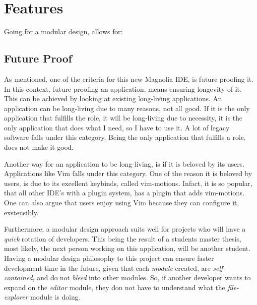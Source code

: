 \documentclass[runningheads]{llncs}
\begin{document}
\section{Features}
Going for a modular design, allows for:

\subsection{Future Proof}
As mentioned, one of the criteria for this new Magnolia IDE, is future proofing
it. In this context, future proofing an application, means ensuring longevity of
it. This can be achieved by looking at existing long-living applications. An
application can be long-living due to many reasons, not all good. If it is the
only application that fulfills the role, it will be long-living due to
necessity, it is the only application that does what I need, so I have to use
it. A lot of legacy software falls under this category. Being the only
application that fulfills a role, does not make it good.

Another way for an application to be long-living, is if it is beloved by its
users. Applications like Vim falls under this category. One of the reason it is
beloved by users, is due to its excellent keybinds, called vim-motions. Infact,
it is so popular, that all other IDE's with a plugin system, has a plugin that
adds vim-motions. One can also argue that users enjoy using Vim because they can
configure it, exstensibly.

Furthermore, a modular design approach suits well for projects who will have a
\textit{quick} rotation of developers. This being the result of a students
master thesis, most likely, the next person working on this application, will be
another student. Having a modular design philosophy to this project can ensure
faster development time in the future, given that each \textit{module} created,
are \textit{self-contained}, and do not \textit{bleed} into other modules. So,
if another developer wants to expand on the \textit{editor} module, they don not
have to understand what the \textit{file-explorer} module is doing.
\end{document}
